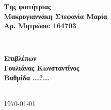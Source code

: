 \documentclass[twoside, a4paper, 11pt]{article}
\begin{document}
\begin{titlepage}
    \begin{minipage}{0.45\textwidth}
    \begin{flushleft} \large
    \textbf{Της φοιτήτριας}
    \\\textbf{Μακρυγιαννάκη Στεφανία Μαρία} %
    \\\textbf{Αρ. Μητρώου: 164703}
    \end{flushleft}
    \end{minipage}
    ~
    \begin{minipage}{0.45\textwidth}
    \begin{flushright} \large
    \textbf{Επιβλέπων}
    \\\textbf{Γουλιάνας Κωνσταντίνος}
    \\\textbf{Βαθμίδα ...?...}
    \end{flushright}
    \end{minipage}\\[5cm]

{\large {}\today}\\[2cm]

\end{titlepage}

\clearpage

\thispagestyle{empty}
\end{document}
